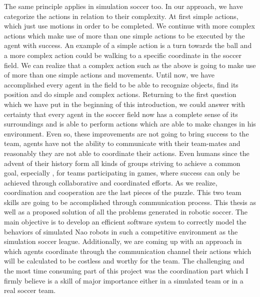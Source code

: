 The same principle applies in simulation soccer too. In our approach, we have categorize the actions in relation to their complexity. At first simple actions, which just use motions in order to be completed. 
We continue with more complex actions which make use of more than one simple actions to be executed by the agent with success. 
An example of a simple action is a turn towards the ball and a more complex action could be walking to a specific coordinate in the soccer field. We can realize that a complex action such as the above is going to make use of more than one simple actions and movements. 
Until now, we have accomplished every agent in the field to be able to recognize objects, find its position and do simple and complex actions.
Returning to the first question which we have put in the beginning of this introduction, we could answer with certainty that every agent in the soccer field now has a complete sense of its surroundings and is able to perform actions which are able to make changes in his environment.
Even so, these improvements are not going to bring success to the team, agents have not the ability to communicate with their team-mates and reasonably they are not able to coordinate their actions. Even humans since the advent of their history form all kinds of groups striving to achieve a common goal, especially , for teams participating in games, where success can only be achieved through collaborative and coordinated efforts. As we realize, coordination and cooperation are the last pieces of the puzzle. This two team skills are going to be accomplished through communication process. 
This thesis as well as a proposed solution of all the problems generated in robotic soccer. 
The main objective is to develop an efficient software system to correctly model the behaviors of simulated Nao robots in such a competitive environment as the simulation soccer league. Additionally, we are coming up with an approach in which agents coordinate through the communication channel their actions  which will be calculated to be costless and worthy for the team.
The challenging and the most time consuming part of this project was the coordination part which I firmly believe is a skill of major importance either in a simulated team or in a real soccer team.


